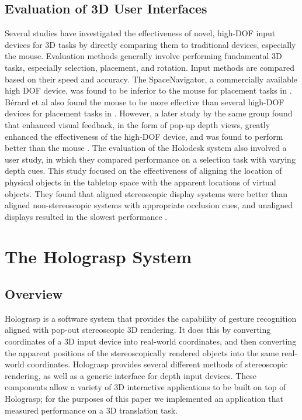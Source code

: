 \documentclass[pageno]{jpaper}
\begin{document}
\subsection{Evaluation of 3D User Interfaces}
Several studies have investigated the effectiveness of novel, high-DOF input devices for 3D tasks by directly comparing them to traditional devices, especially the mouse.
Evaluation methods generally involve performing fundamental 3D tasks, especially selection, placement, and rotation. Input methods are compared based on their
speed and accuracy. The SpaceNavigator, a commercially available high DOF device, was found to be inferior to the mouse for placement tasks in
\cite{mattheiss2011navigating}. B{\'e}rard et al also found the mouse to be more effective than several high-DOF devices for placement tasks
in \cite{study1}.  However, a later study by the same group found that enhanced visual feedback, in the form of pop-up depth views, greatly enhanced the effectiveness
of the high-DOF device, and was found to perform better than the mouse \cite{study2}. The
evaluation of the Holodesk system also involved a user study, in which they compared performance on a selection task with varying depth cues. This study focused on
the effectiveness of aligning the location of physical objects in the tabletop space with the apparent locations of virtual objects. They found that aligned
stereoscopic display systems were better than aligned non-stereoscopic systems with appropriate occlusion cues, and unaligned displays resulted in the slowest performance \cite{holodesk}.
\newpage
\section{The Holograsp System}
\subsection{Overview}
Holograsp is a software system that provides the capability of gesture recognition aligned with pop-out stereoscopic 3D rendering. 
It does this by converting coordinates of a 3D input device into real-world coordinates, and then converting the 
apparent positions of the stereoscopically rendered objects into the same real-world coordinates. 
Holograsp provides several different methods of stereoscopic rendering, as well as
a generic interface for depth input devices. These components allow a variety of 3D interactive applications to be built on top of Holograsp;
for the purposes of this paper we implemented an application that measured performance on a 3D translation task.
\end{document}
